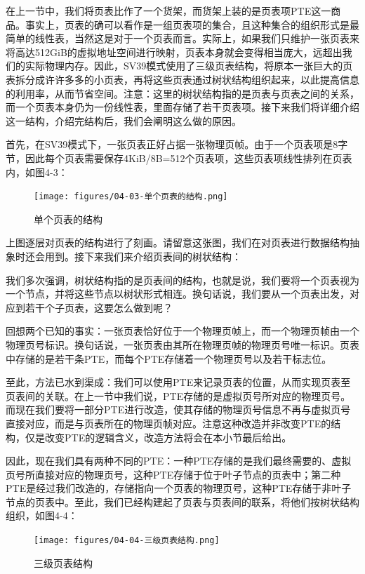 在上一节中，我们将页表比作了一个货架，而货架上装的是页表项PTE这一商品。事实上，页表的确可以看作是一组页表项的集合，且这种集合的组织形式是最简单的线性表，当然这是对于一个页表而言。实际上，如果我们只维护一张页表来将高达512GiB的虚拟地址空间进行映射，页表本身就会变得相当庞大，远超出我们的实际物理内存。因此，SV39模式使用了三级页表结构，将原本一张巨大的页表拆分成许许多多的小页表，再将这些页表通过树状结构组织起来，以此提高信息的利用率，从而节省空间。注意：这里的树状结构指的是页表与页表之间的关系，而一个页表本身仍为一份线性表，里面存储了若干页表项。接下来我们将详细介绍这一结构，介绍完结构后，我们会阐明这么做的原因。

首先，在SV39模式下，一张页表正好占据一张物理页帧。由于一个页表项是8字节，因此每个页表需要保存4KiB/8B=512个页表项，这些页表项线性排列在页表内，如图4-3：

\begin{figure}[h]
	\centering
	\texttt{[image: figures/04-03-单个页表的结构.png]}
	\caption{单个页表的结构}
\end{figure}\FloatBarrier

上图逐层对页表的结构进行了刻画。请留意这张图，我们在对页表进行数据结构抽象时还会用到。接下来我们来介绍页表间的树状结构：

我们多次强调，树状结构指的是页表间的结构，也就是说，我们要将一个页表视为一个节点，并将这些节点以树状形式相连。换句话说，我们要从一个页表出发，对应到若干个子页表，这要怎么做到呢？

回想两个已知的事实：一张页表恰好位于一个物理页帧上，而一个物理页帧由一个物理页号标识。换句话说，一张页表由其所在物理页帧的物理页号唯一标识。页表中存储的是若干条PTE，而每个PTE存储着一个物理页号以及若干标志位。

至此，方法已水到渠成：我们可以使用PTE来记录页表的位置，从而实现页表至页表间的关联。在上一节中我们说，PTE存储的是虚拟页号所对应的物理页号。而现在我们要将一部分PTE进行改造，使其存储的物理页号信息不再与虚拟页号直接对应，而是与页表所在的物理页帧对应。注意这种改造并非改变PTE的结构，仅是改变PTE的逻辑含义，改造方法将会在本小节最后给出。

因此，现在我们具有两种不同的PTE：一种PTE存储的是我们最终需要的、虚拟页号所直接对应的物理页号，这种PTE存储于位于叶子节点的页表中；第二种PTE是经过我们改造的，存储指向一个页表的物理页号，这种PTE存储于非叶子节点的页表中。至此，我们已经构建起了页表与页表间的联系，将他们按树状结构组织，如图4-4：

\begin{figure}[h]
	\centering
	\texttt{[image: figures/04-04-三级页表结构.png]}
	\caption{三级页表结构}
\end{figure}\FloatBarrier

